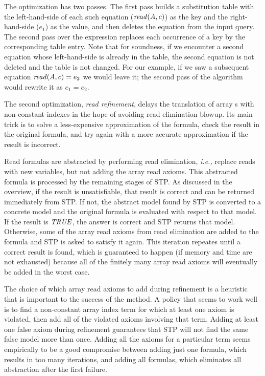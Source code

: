 
The optimization has two passes. The first pass builds a substitution
table with the left-hand-side of each such equation (${\it read}(A, c)$)
as the key and the right-hand-side ($e_1$) as the value, and then
deletes the equation from the input query. The second pass over the
expression replaces each occurrence of a key by the corresponding
table entry. Note that for soundness, if we encounter a second
equation whose left-hand-side is already in the table, the second
equation is not deleted and the table is not changed. For our example,
if we saw a subsequent equation ${\it read}(A, c) = e_2$ we would leave
it; the second pass of the algorithm would rewrite it as $e_1 = e_2$.

The second optimization, {\it read refinement}, delays the translation
of array {\stpread}s with non-constant indexes in the hope of avoiding
read elimination blowup. Its main trick is to solve a less-expensive
approximation of the formula, check the result in the original
formula, and try again with a more accurate approximation if the
result is incorrect.

Read formulas are abstracted by performing read elimination,
{\em i.e.,} replace reads with new variables, but not adding the array read
axioms.  This abstracted formula is processed by the remaining
stages of STP.  As discussed in the overview, if the result is
unsatisfiable, that result is correct and can be returned immediately
from STP.  If not, the abstract model found by STP is converted to a
concrete model and the original formula is evaluated with respect to
that model.  If the result is ${\it TRUE}$, the answer is correct and
STP returns that model.  Otherwise, some of the array read axioms from
read elimination are added to the formula and STP is asked to satisfy
it again.  This iteration repeates until a correct result is found,
which is guaranteed to happen (if memory and time are not exhausted)
because all of the finitely many array read axioms will eventually be
added in the worst case.

The choice of which array read axioms to add during refinement is a
heuristic that is important to the success of the method.  A policy
that seems to work well is to find a non-constant array index term for
which at least one axiom is violated, then add all of the violated
axioms involving that term.  Adding at least one false axiom during
refinement guarantees that STP will not find the same false model more
than once.  Adding all the axioms for a particular term seems
empirically to be a good compromise between adding just one formula,
which results in too many iterations, and adding all formulas, which
eliminates all abstraction after the first failure.

